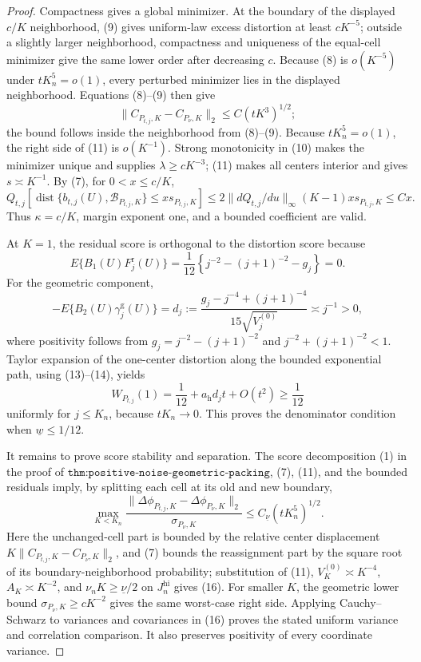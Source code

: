 \documentclass{article}
\begin{document}
\begin{proof}
Compactness gives a global minimizer.  At the boundary of the displayed \(c/K\) neighborhood, (9) gives uniform-law excess distortion at least \(cK^{-5}\); outside a slightly larger neighborhood, compactness and uniqueness of the equal-cell minimizer give the same lower order after decreasing \(c\).  Because (8) is \(o(K^{-5})\) under \(tK_n^5=o(1)\), every perturbed minimizer lies in the displayed neighborhood.  Equations (8)--(9) then give
\[
 \|C_{P_{t,j},K}-C_{P_\nu,K}\|_2\leq C(tK^3)^{1/2};                     \tag{11}
\]
the bound follows inside the neighborhood from (8)--(9).  Because \(tK_n^5=o(1)\), the right side of (11) is \(o(K^{-1})\).  Strong monotonicity in (10) makes the minimizer unique and supplies \(\lambda\geq cK^{-3}\); (11) makes all centers interior and gives \(s\asymp K^{-1}\).  By (7), for \(0<x\leq c/K\),
\[
 Q_{t,j}\!\left[\operatorname{dist}\{b_{t,j}(U),\mathcal B_{P_{t,j},K}\}
 \leq x s_{P_{t,j},K}\right]
 \leq2\|dQ_{t,j}/du\|_\infty(K-1)xs_{P_{t,j},K}\leq Cx.                 \tag{12}
\]
Thus \(\kappa=c/K\), margin exponent one, and a bounded coefficient are valid.

At \(K=1\), the residual score is orthogonal to the distortion score because
\[
 E\{B_1(U)F_j^{\mathrm r}(U)\}
 =\frac1{12}\left\{j^{-2}-(j+1)^{-2}-g_j\right\}=0.                     \tag{13}
\]
For the geometric component,
\[
 -E\{B_2(U)\gamma_j^{\mathrm g}(U)\}
 =d_j:=\frac{g_j-j^{-4}+(j+1)^{-4}}{15\sqrt{V_j^{(0)}}}\asymp j^{-1}>0,  \tag{14}
\]
where positivity follows from \(g_j=j^{-2}-(j+1)^{-2}\) and
\(j^{-2}+(j+1)^{-2}<1\).  Taylor expansion of the one-center distortion along the bounded exponential path, using (13)--(14), yields
\[
 W_{P_{t,j}}(1)=\frac1{12}+a_{\mathrm h}d_jt+O(t^2)\geq\frac1{12}         \tag{15}
\]
uniformly for \(j\leq K_n\), because \(tK_n\to0\).  This proves the denominator condition when \(\underline w\leq1/12\).

It remains to prove score stability and separation.  The score decomposition (1) in the proof of \(\texttt{thm:positive-noise-geometric-packing}\), (7), (11), and the bounded residuals imply, by splitting each cell at its old and new boundary,
\[
 \max_{K<K_n}\frac{\|\Delta\phi_{P_{t,j},K}-\Delta\phi_{P_\nu,K}\|_2}
 {\sigma_{P_\nu,K}}
 \leq C_{\underline\nu}(tK_n^5)^{1/2}.                                  \tag{16}
\]
Here the unchanged-cell part is bounded by the relative center displacement \(K\|C_{P_{t,j},K}-C_{P_\nu,K}\|_2\), and (7) bounds the reassignment part by the square root of its boundary-neighborhood probability; substitution of (11), \(V_K^{(0)}\asymp K^{-4}\), \(A_K\asymp K^{-2}\), and \(\nu_nK\geq\underline\nu/2\) on \(J_n^{\mathrm{hi}}\) gives (16).  For smaller \(K\), the geometric lower bound \(\sigma_{P_\nu,K}\geq cK^{-2}\) gives the same worst-case right side.  Applying Cauchy--Schwarz to variances and covariances in (16) proves the stated uniform variance and correlation comparison.  It also preserves positivity of every coordinate variance.


\end{proof}
\end{document}
